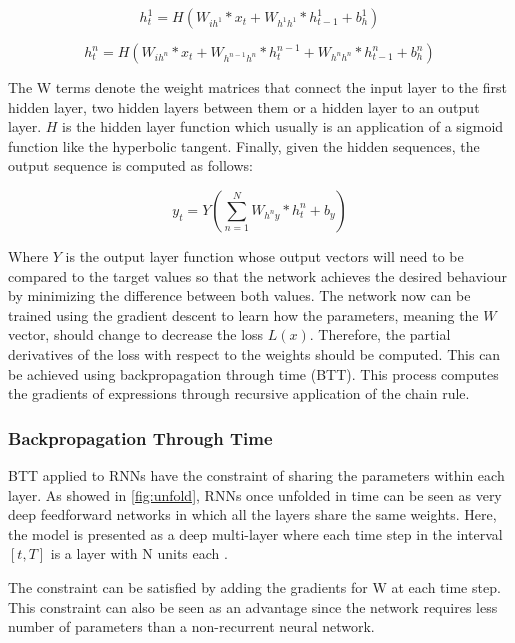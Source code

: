 \begin{equation} \label{eq:hidden1}
h_t^1= H( W_{ih^1} * x_t + W_{h^1 h^1}*h^1_{t-1} + b^1_h)
\end{equation}

\begin{equation} \label{eq:hidden}
h_t^n= H(W_{ih^n} * x_t + W_{h^{n-1}  h^n} * h^{n-1}_t +W_{h^n h^n} * h^n_{t-1}+ b^n_h)
\end{equation}

The W terms denote the weight matrices that connect the input layer to the first hidden layer, two hidden layers between them or a hidden layer to an output layer. $H$ is the hidden layer function which usually is an application of a sigmoid function like the hyperbolic tangent. Finally, given the hidden sequences, the output sequence is computed as follows:

\begin{equation} \label{eq:output}
y_t=Y(\sum_{n=1}^{N} W_{h^{n}y} * h^n_t + b_y)
\end{equation}

Where $Y$ is the output layer function whose output vectors will need to be compared to the target values so that the network achieves the desired behaviour by minimizing the difference between both values.
The network now can be trained using the gradient descent to learn how the parameters, meaning the $W$ vector, should change to decrease the loss  $L(x)$. Therefore, the partial derivatives of the loss with respect to the weights should be computed. This can be achieved using backpropagation through time (BTT). This process computes the gradients of expressions through recursive application of the chain rule.

\subsubsection{Backpropagation Through Time}
BTT applied to RNNs have the constraint of sharing the parameters within each layer. As showed in  \ref{fig:unfold}, RNNs once unfolded in time can be seen as very deep feedforward networks in which all the layers share the same weights\cite{lecun2015deep}. Here, the model is presented as a deep multi-layer where each time step in the interval $[t,T]$ is a layer with N units each \cite{pascanu2013difficulty}. 

The constraint can be satisfied by adding the gradients for W at each time step. This constraint can also be seen as an advantage since the network requires less number of parameters than a non-recurrent neural network.

